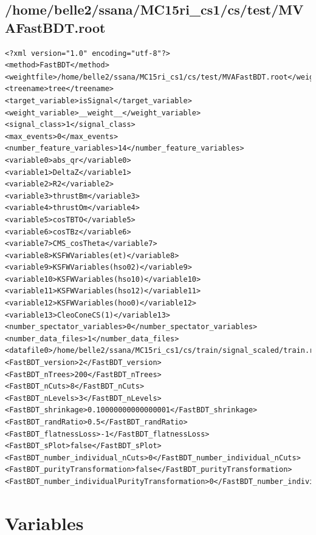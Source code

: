 \documentclass[10pt,a4paper]{article}
\begin{document}
\subsection{/home/belle2/ssana/MC15ri\_cs1/cs/test/MVAFastBDT.root}
\lstset{language=XML}
\begin{lstlisting}[breaklines=true]
<?xml version="1.0" encoding="utf-8"?>
<method>FastBDT</method>
<weightfile>/home/belle2/ssana/MC15ri_cs1/cs/test/MVAFastBDT.root</weightfile>
<treename>tree</treename>
<target_variable>isSignal</target_variable>
<weight_variable>__weight__</weight_variable>
<signal_class>1</signal_class>
<max_events>0</max_events>
<number_feature_variables>14</number_feature_variables>
<variable0>abs_qr</variable0>
<variable1>DeltaZ</variable1>
<variable2>R2</variable2>
<variable3>thrustBm</variable3>
<variable4>thrustOm</variable4>
<variable5>cosTBTO</variable5>
<variable6>cosTBz</variable6>
<variable7>CMS_cosTheta</variable7>
<variable8>KSFWVariables(et)</variable8>
<variable9>KSFWVariables(hso02)</variable9>
<variable10>KSFWVariables(hso10)</variable10>
<variable11>KSFWVariables(hso12)</variable11>
<variable12>KSFWVariables(hoo0)</variable12>
<variable13>CleoConeCS(1)</variable13>
<number_spectator_variables>0</number_spectator_variables>
<number_data_files>1</number_data_files>
<datafile0>/home/belle2/ssana/MC15ri_cs1/cs/train/signal_scaled/train.root</datafile0>
<FastBDT_version>2</FastBDT_version>
<FastBDT_nTrees>200</FastBDT_nTrees>
<FastBDT_nCuts>8</FastBDT_nCuts>
<FastBDT_nLevels>3</FastBDT_nLevels>
<FastBDT_shrinkage>0.10000000000000001</FastBDT_shrinkage>
<FastBDT_randRatio>0.5</FastBDT_randRatio>
<FastBDT_flatnessLoss>-1</FastBDT_flatnessLoss>
<FastBDT_sPlot>false</FastBDT_sPlot>
<FastBDT_number_individual_nCuts>0</FastBDT_number_individual_nCuts>
<FastBDT_purityTransformation>false</FastBDT_purityTransformation>
<FastBDT_number_individualPurityTransformation>0</FastBDT_number_individualPurityTransformation>
\end{lstlisting}\raggedbottom
\pagebreak[0]
\FloatBarrier
\section{Variables}
\end{document}
